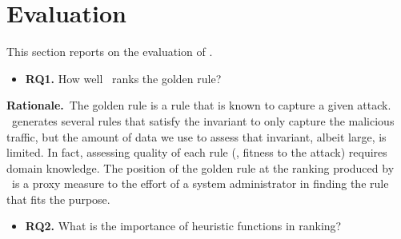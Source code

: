 \documentclass[sigconf,review, anonymous]{acmart}
\begin{document}
\section{Evaluation}

This section reports on the evaluation of \tname{}.


\newcommand{\textRQone}{How well \tname\ ranks the golden rule?}
\vspace{0.2cm}
\begin{itemize}[leftmargin=*]
\item{\textbf{RQ1.}} \textRQone
\end{itemize}

\textbf{Rationale.}~The golden rule is a rule that is known to capture
a given attack. \tname\ generates several rules that satisfy the
invariant to only capture the malicious traffic, but the amount of
data we use to assess that invariant, albeit large, is limited. In
fact, assessing quality of each rule (\ie{}, fitness to the attack)
requires domain knowledge. The position of the golden rule at the
ranking produced by \tname\ is a proxy measure to the effort of a
system administrator in finding the rule that fits the purpose.


\newcommand{\textRQtwo}{What is the importance of heuristic functions in ranking?}
\vspace{0.2cm}
\begin{itemize}[leftmargin=*]
\item{\textbf{RQ2.}} \textRQtwo\
\end{itemize}



    
\end{document}
